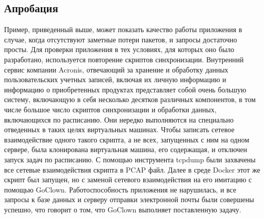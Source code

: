\subsection{Апробация}
Пример, приведенный выше, может показать качество работы приложения в случае,
когда отсутствуют заметные потери пакетов, и запросы достаточно просты.
Для проверки приложения в тех условиях, для которых оно было разработано,
используется повторение скриптов синхронизации.
Внутренний сервис компании Acronis, отвечающий за хранение и обработку данных
пользовательских учетных записей, включая их личную информацию и информацию
о приобретенных продуктах представляет собой очень большую систему, включающую
в себя несколько десятков различных компонентов, в том числе большое число
скриптов синхронизации и обработки данных, включающихся по расписанию. Они
нередко выполняются на специально отведенных в таких целях виртуальных машинах.
Чтобы записать сетевое взаимодействие одного такого скрипта, а не всех,
запущенных с ним на одном сервере, была клонирована виртуальная машина, его
содержащая, и отключен запуск задач по расписанию. С помощью инструмента
tcpdump были захвачены все сетевые взаимодействия скрипта в PCAP файл.
Далее в среде Docker этот же скрипт был запущен, но с заменой сетевого
взаимодействия на его имитацию с помощью GoClown. Работоспособность приложения
не нарушилась, и все запросы к базе данных и серверу отправки электронной почты
были совершены успешно, что говорит о том, что GoClown выполняет поставленную
задачу.
